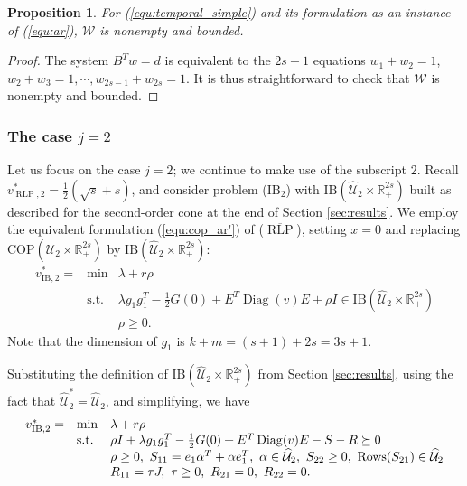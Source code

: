 \documentclass[12pt]{article}
\DeclareMathOperator{\st}{s.t.}
\DeclareMathOperator{\Diag}{Diag}
\DeclareMathOperator{\AR}{RLP}
\newtheorem{proposition}{Proposition}
\newcommand{\W}{{\mathcal{W}}}
\newcommand{\K}{\widehat{\mathcal{U}}}
\newcommand{\COP}{{\mathrm{COP}}}
\newcommand{\IB}{\mathrm{IB}}
\def\RR{{\mathbb{R}}}
\begin{document}
\begin{onehalfspace}
\begin{proposition}
For (\ref{equ:temporal_simple}) and its formulation as an instance of
(\ref{equ:ar}), $\W$ is nonempty and bounded.
\end{proposition}

\begin{proof}
The system $B^Tw = d$ is equivalent to the $2s -1$ equations $w_1 +
w_2 = 1$, $w_2 + w_3 = 1, \cdots, w_{2s-1} + w_{2s} = 1$. It is thus
straightforward to check that $\W$ is nonempty and bounded.
\end{proof}

\subsubsection{The case $j=2$}

Let us focus on the case $j=2$; we continue to make use of the subscript
$2$. Recall $v^*_{\AR,2} = \tfrac12 (\sqrt{s} + s)$, and consider
problem ($\IB_2$) with $\IB(\K_2 \times \RR_+^{2s})$ built as described
for the second-order cone at the end of Section \ref{sec:results}.
We employ the equivalent formulation (\ref{equ:cop_ar'}) of
($\overline{\AR}$), setting $x = 0$ and replacing $\COP(\K_2
\times \RR_+^{2s})$ by $\IB(\K_2 \times \RR_+^{2s})$:
\begin{equation} \label{equ:IB2}
\begin{array}{lll}
v_{\IB,2}^* = & \min
& \lambda + r\rho\\
& \st & \lambda g_1g_1^T
- \tfrac12 G(0) + E^T\Diag(v)E + \rho I
\in \IB(\K_2 \times \RR_+^{2s}) \\ 
& & \rho \ge 0.
\end{array}
\end{equation}
Note that the dimension of $g_1$ is $k + m = (s+1) + 2s = 3s + 1$.

Substituting the definition of $\IB(\K_2
\times \RR_+^{2s})$ from Section \ref{sec:results}, using the fact that
$\K_2^* = \K_2$, and simplifying, we have
\begin{equation} \label{equ:temporal1}
\begin{array}{lll}
v_{\IB,2}^* = & \min 
& \lambda + r\rho\\
& \st &
\rho I + 
\lambda g_1g_1^T 
- \tfrac12 G(0) 
+ E^T\Diag(v)E
- S - R\succeq 0  \\
& & \rho \ge 0, \ S_{11} = e_1\alpha^T + \alpha e_1^T, \ \alpha \in \K_2, \ S_{22} \ge 0, \ \text{\rm Rows}(S_{21}) \in \K_2 \\
& & R_{11} = \tau J, \ \tau \ge 0, \ R_{21} = 0, \ R_{22} = 0.
\end{array}
\end{equation}


\end{onehalfspace}
\end{document}
